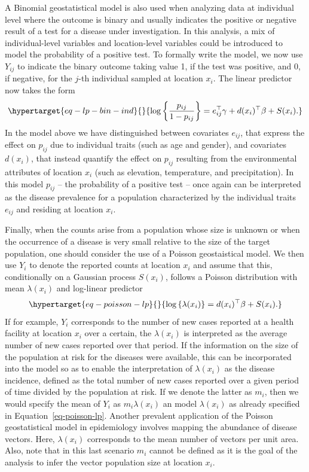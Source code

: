 \documentclass[
  letterpaper,
]{krantz}
\begin{document}
A Binomial geostatistical model is also used when analyzing data at
individual level where the outcome is binary and usually indicates the
positive or negative result of a test for a disease under investigation.
In this analysis, a mix of individual-level variables and location-level
variables could be introduced to model the probability of a positive
test. To formally write the model, we now use \(Y_{ij}\) to indicate the
binary outcome taking value 1, if the test was positive, and 0, if
negative, for the \(j\)-th individual sampled at location \(x_i\). The
linear predictor now takes the form
\begin{equation}\protect\hypertarget{eq-lp-bin-ind}{}{
\log\left\{\frac{p_{ij}}{1-p_{ij}}\right\} = e_{ij}^\top \gamma + d(x_{i})^\top \beta + S(x_i).
}\label{eq-lp-bin-ind}\end{equation} In the model above we have
distinguished between covariates \(e_{ij}\), that express the effect on
\(p_{ij}\) due to individual traits (such as age and gender), and
covariates \(d(x_i)\), that instead quantify the effect on \(p_{ij}\)
resulting from the environmental attributes of location \(x_i\) (such as
elevation, temperature, and precipitation). In this model \(p_{ij}\) --
the probability of a positive test -- once again can be interpreted as
the disease prevalence for a population characterized by the individual
traits \(e_{ij}\) and residing at location \(x_i\).

Finally, when the counts arise from a population whose size is unknown
or when the occurrence of a disease is very small relative to the size
of the target population, one should consider the use of a Poisson
geostaistical model. We then use \(Y_i\) to denote the reported counts
at location \(x_i\) and assume that this, conditionally on a Gaussian
process \(S(x_i)\), follows a Poisson distribution with mean
\(\lambda(x_i)\) and log-linear predictor
\begin{equation}\protect\hypertarget{eq-poisson-lp}{}{
\log\left\{\lambda(x_i)\right\} = d(x_i)^\top \beta + S(x_i). 
}\label{eq-poisson-lp}\end{equation} If for example, \(Y_i\) corresponds
to the number of new cases reported at a health facility at location
\(x_i\) over a certain, the \(\lambda(x_i)\) is interpreted as the
average number of new cases reported over that period. If the
information on the size of the population at risk for the diseases were
available, this can be incorporated into the model so as to enable the
interpretation of \(\lambda(x_i)\) as the disease incidence, defined as
the total number of new cases reported over a given period of time
divided by the population at risk. If we denote the latter as \(m_i\),
then we would specify the mean of \(Y_i\) as \(m_i\lambda(x_i)\) an
model \(\lambda(x_i)\) as already specified in
Equation~\ref{eq-poisson-lp}. Another prevalent application of the
Poisson geostatistical model in epidemiology involves mapping the
abundance of disease vectors. Here, \(\lambda(x_i)\) corresponds to the
mean number of vectors per unit area. Also, note that in this last
scenario \(m_i\) cannot be defined as it is the goal of the analysis to
infer the vector population size at location \(x_i\).
\end{document}
